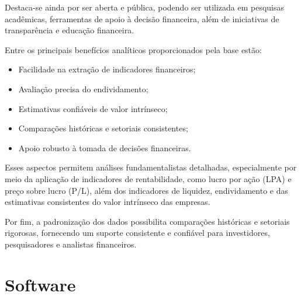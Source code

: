Destaca-se ainda por ser aberta e pública, podendo ser utilizada em pesquisas acadêmicas, ferramentas de apoio à decisão financeira, além de iniciativas de transparência e educação financeira.

Entre os principais benefícios analíticos proporcionados pela base estão:

\begin{itemize}
	\item Facilidade na extração de indicadores financeiros;
	\item Avaliação precisa do endividamento;
	\item Estimativas confiáveis de valor intrínseco;
	\item Comparações históricas e setoriais consistentes;
	\item Apoio robusto à tomada de decisões financeiras.
\end{itemize}

Esses aspectos permitem análises fundamentalistas detalhadas, especialmente por meio da aplicação de indicadores de rentabilidade, como lucro por ação (LPA) e preço sobre lucro (P/L), além dos indicadores de liquidez, endividamento e das estimativas consistentes do valor intrínseco das empresas.

Por fim, a padronização dos dados possibilita comparações históricas e setoriais rigorosas, fornecendo um suporte consistente e confiável para investidores, pesquisadores e analistas financeiros.

\section{Software} \label{sec:software}





